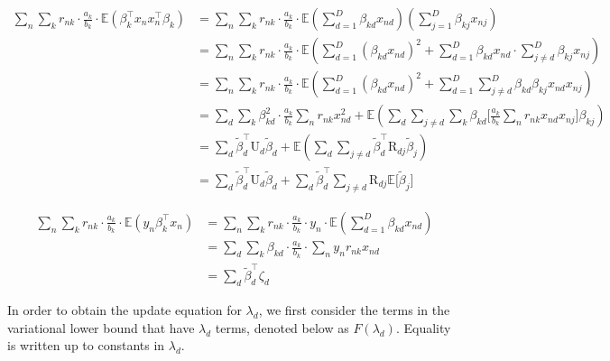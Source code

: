 \documentclass[twoside,11pt]{article}
\newcommand{\transpose}[1]{#1^{\intercal}}
\newcommand{\nsum}{\sum\limits_{n}}
\newcommand{\ksum}{\sum\limits_{k}}
\newcommand{\E}{\mathbb{E}}
\newcommand{\betad}{\tilde{\beta}_d}
\begin{document}
\begin{align*}
	\nsum \ksum r_{nk} \cdot \frac{a_k}{b_k} \cdot \E \left( \transpose{\beta_k} x_n \transpose{x_n} \beta_k \right) &= \nsum \ksum r_{nk} \cdot \frac{a_k}{b_k} \cdot \E \left( \sum_{d=1}^D \beta_{kd} x_{nd} \right) \left( \sum_{j=1}^D \beta_{kj} x_{nj} \right) \\
	&= \nsum \ksum r_{nk} \cdot \frac{a_k}{b_k} \cdot \E\left( \sum_{d=1}^D (\beta_{kd}x_{nd})^2 + \sum_{d=1}^D \beta_{kd} x_{nd} \cdot \sum_{j\neq d}^D \beta_{kj}x_{nj}\right) \\
	&= \nsum \ksum r_{nk} \cdot \frac{a_k}{b_k} \cdot \E \left( \sum_{d=1}^D (\beta_{kd}x_{nd})^2 + \sum_{d=1}^D \sum_{j\neq d}^D \beta_{kd} \beta_{kj} x_{nd} x_{nj} \right) \\
	&= \sum_{d} \ksum \beta_{kd}^2 \cdot \frac{a_k}{b_k} \nsum r_{nk} x_{nd}^2 + \E \left( \sum_{d} \sum_{j\neq d} \ksum \beta_{kd} \Big[\frac{a_k}{b_k}\sum_n r_{nk} x_{nd} x_{nj} \Big] \beta_{kj} \right) \\
	&= \sum_d \transpose{\betad} \mathrm{U}_d \betad + \E \left( \sum_d \sum_{j\neq d} \transpose{\betad} \mathrm{R}_{dj} \tilde{\beta}_j \right) \\
	&= \sum_d \transpose{\betad} \mathrm{U}_d \betad + \sum_d \transpose{\betad} \sum_{j \neq d} \mathrm{R}_{dj} \E \big[ \tilde{\beta}_j \big]
\end{align*}

\begin{align*}
	\nsum \ksum r_{nk} \cdot \frac{a_k}{b_k} \cdot \E \left( y_n \transpose{\beta_k}x_n \right) &= 
	\nsum \ksum r_{nk} \cdot \frac{a_k}{b_k} \cdot y_n \cdot \E \left( \sum_{d=1}^D \beta_{kd} x_{nd}\right)\\
	&= \sum_d \sum_k \beta_{kd} \cdot \frac{a_k}{b_k} \cdot \sum_n y_n r_{nk} x_{nd} \\
	&= \sum_d \transpose{\betad} \zeta_d
\end{align*}


In order to obtain the update equation for $\lambda_d$, we first consider the terms in the variational lower bound that have $\lambda_d$ terms, denoted below as $F(\lambda_d)$. Equality is written up to constants in $\lambda_d$.
\end{document}
